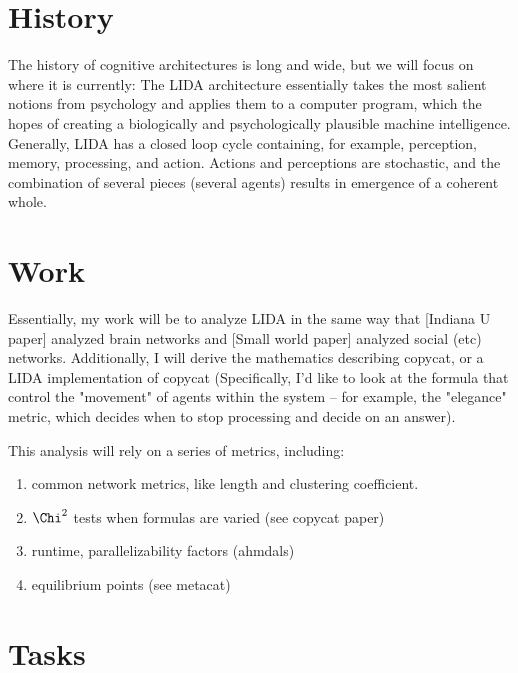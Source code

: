 \documentclass{nature}
\begin{document}
\section{History}


    The history of cognitive architectures is long and wide, but we will focus on where it is currently: 
    The LIDA architecture essentially takes the most salient notions from psychology and applies them to a computer program, which the hopes of creating a biologically and psychologically plausible machine intelligence.
    Generally, LIDA has a closed loop cycle containing, for example, perception, memory, processing, and action.
    Actions and perceptions are stochastic, and the combination of several pieces (several agents) results in emergence of a coherent whole.

\section{Work}

    Essentially, my work will be to analyze LIDA in the same way that [Indiana U paper] analyzed brain networks and [Small world paper] analyzed social (etc) networks. 
    Additionally, I will derive the mathematics describing copycat, or a LIDA implementation of copycat (Specifically, I'd like to look at the formula that control the "movement" of agents within the system -- for example, the "elegance" metric, which decides when to stop processing and decide on an answer). 

    This analysis will rely on a series of metrics, including:
    \begin{enumerate}
        \item common network metrics, like length and clustering coefficient.
        \item $\Chi^2$ tests when formulas are varied (see copycat paper)
        \item runtime, parallelizability factors (ahmdals)
        \item equilibrium points (see metacat)
    \end{enumerate}


\section{Tasks}
\end{document}
